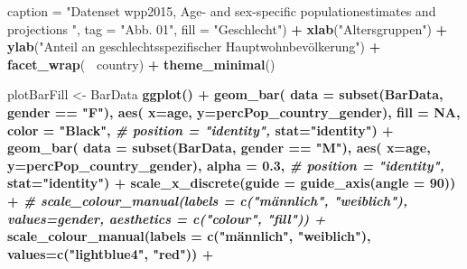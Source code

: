 \documentclass[
]{article}
\newenvironment{Shaded}{\begin{snugshade}}{\end{snugshade}}
\newcommand{\CommentTok}[1]{\textcolor[rgb]{0.56,0.35,0.01}{\textit{#1}}}
\newcommand{\DataTypeTok}[1]{\textcolor[rgb]{0.13,0.29,0.53}{#1}}
\newcommand{\DecValTok}[1]{\textcolor[rgb]{0.00,0.00,0.81}{#1}}
\newcommand{\FloatTok}[1]{\textcolor[rgb]{0.00,0.00,0.81}{#1}}
\newcommand{\KeywordTok}[1]{\textcolor[rgb]{0.13,0.29,0.53}{\textbf{#1}}}
\newcommand{\NormalTok}[1]{#1}
\newcommand{\OperatorTok}[1]{\textcolor[rgb]{0.81,0.36,0.00}{\textbf{#1}}}
\newcommand{\OtherTok}[1]{\textcolor[rgb]{0.56,0.35,0.01}{#1}}
\newcommand{\StringTok}[1]{\textcolor[rgb]{0.31,0.60,0.02}{#1}}
\begin{document}
\begin{Shaded}
\begin{Highlighting}[]
{{{{{{{{      \DataTypeTok{caption =} \StringTok{"Datenset wpp2015, Age- and sex-specific populationestimates and projections "}\NormalTok{,}
      \DataTypeTok{tag =} \StringTok{"Abb. 01"}\NormalTok{,}
      \DataTypeTok{fill =} \StringTok{"Geschlecht"}\NormalTok{) }\OperatorTok{+}
\StringTok{    }\KeywordTok{xlab}\NormalTok{(}\StringTok{"Altersgruppen"}\NormalTok{) }\OperatorTok{+}
\StringTok{    }\KeywordTok{ylab}\NormalTok{(}\StringTok{"Anteil an geschlechtsspezifischer Hauptwohnbevölkerung"}\NormalTok{) }\OperatorTok{+}
\StringTok{  }\KeywordTok{facet_wrap}\NormalTok{(}\OperatorTok{~}\StringTok{ }\NormalTok{country) }\OperatorTok{+}
\StringTok{  }\KeywordTok{theme_minimal}\NormalTok{()}



\NormalTok{plotBarFill <-}\StringTok{ }\NormalTok{BarData }\OperatorTok{%
\StringTok{    }\KeywordTok{ggplot}\NormalTok{() }\OperatorTok{+}
\StringTok{    }\KeywordTok{geom_bar}\NormalTok{(}
      \DataTypeTok{data =} \KeywordTok{subset}\NormalTok{(BarData, gender }\OperatorTok{==}\StringTok{ "F"}\NormalTok{), }
      \KeywordTok{aes}\NormalTok{(}
        \DataTypeTok{x=}\NormalTok{age, }
        \DataTypeTok{y=}\NormalTok{percPop_country_gender),}
      \DataTypeTok{fill =} \OtherTok{NA}\NormalTok{,}
      \DataTypeTok{color =} \StringTok{"Black"}\NormalTok{,}
      \CommentTok{# position = "identity",}
      \DataTypeTok{stat=}\StringTok{"identity"}\NormalTok{) }\OperatorTok{+}
\StringTok{    }\KeywordTok{geom_bar}\NormalTok{(}
      \DataTypeTok{data =} \KeywordTok{subset}\NormalTok{(BarData, gender }\OperatorTok{==}\StringTok{ "M"}\NormalTok{), }
      \KeywordTok{aes}\NormalTok{(}
        \DataTypeTok{x=}\NormalTok{age, }
        \DataTypeTok{y=}\NormalTok{percPop_country_gender),}
      \DataTypeTok{alpha =} \FloatTok{0.3}\NormalTok{,}
      \CommentTok{# position = "identity",}
      \DataTypeTok{stat=}\StringTok{"identity"}\NormalTok{) }\OperatorTok{+}
\StringTok{    }\KeywordTok{scale_x_discrete}\NormalTok{(}\DataTypeTok{guide =} \KeywordTok{guide_axis}\NormalTok{(}\DataTypeTok{angle =} \DecValTok{90}\NormalTok{)) }\OperatorTok{+}
\StringTok{    }\CommentTok{# scale_colour_manual(labels = c("männlich", "weiblich"), values=gender, aesthetics = c("colour", "fill")) +}
\StringTok{    }\KeywordTok{scale_colour_manual}\NormalTok{(}\DataTypeTok{labels =} \KeywordTok{c}\NormalTok{(}\StringTok{"männlich"}\NormalTok{, }\StringTok{"weiblich"}\NormalTok{), }\DataTypeTok{values=}\KeywordTok{c}\NormalTok{(}\StringTok{"lightblue4"}\NormalTok{, }\StringTok{"red"}\NormalTok{)) }\OperatorTok{+}
}}}}}}}}}
\end{Highlighting}
\end{Shaded}
\end{document}
